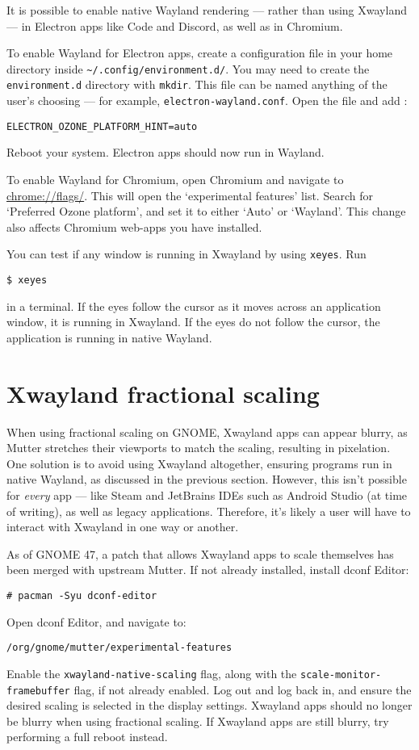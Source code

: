 \documentclass[a4paper]{article}
\begin{document}
It is possible to enable native Wayland rendering --- rather than using Xwayland --- in Electron apps like Code and Discord, as well as in Chromium.

To enable Wayland for Electron apps, create a configuration file in your home directory inside \lstinline|~/.config/environment.d/|.
You may need to create the \lstinline|environment.d| directory with \lstinline|mkdir|.
This file can be named anything of the user's choosing --- for example, \lstinline|electron-wayland.conf|.
Open the file and add \cite{arch-wiki-wayland}:
\begin{lstlisting}
ELECTRON_OZONE_PLATFORM_HINT=auto
\end{lstlisting}
Reboot your system.
Electron apps should now run in Wayland.

To enable Wayland for Chromium, open Chromium and navigate to \url{chrome://flags/}.
This will open the `experimental features' list.
Search for `Preferred Ozone platform', and set it to either `Auto' or `Wayland'.
This change also affects Chromium web-apps you have installed.

You can test if any window is running in Xwayland by using \lstinline|xeyes|.
Run
\begin{lstlisting}
$ xeyes
\end{lstlisting}
in a terminal.
If the eyes follow the cursor as it moves across an application window, it is running in Xwayland.
If the eyes do not follow the cursor, the application is running in native Wayland.


\section{Xwayland fractional scaling}

When using fractional scaling on GNOME, Xwayland apps can appear blurry, as Mutter stretches their viewports to match the scaling, resulting in pixelation.
One solution is to avoid using Xwayland altogether, ensuring programs run in native Wayland, as discussed in the previous section.
However, this isn't possible for \emph{every} app --- like Steam and JetBrains IDEs such as Android Studio (at time of writing), as well as legacy applications.
Therefore, it's likely a user will have to interact with Xwayland in one way or another.

As of GNOME 47, a patch that allows Xwayland apps to scale themselves has been merged with upstream Mutter.
If not already installed, install dconf Editor:
\begin{lstlisting}
# pacman -Syu dconf-editor
\end{lstlisting}
Open dconf Editor, and navigate to:
\begin{lstlisting}
/org/gnome/mutter/experimental-features
\end{lstlisting}
Enable the \lstinline|xwayland-native-scaling| flag, along with the \lstinline|scale-monitor-framebuffer| flag, if not already enabled.
Log out and log back in, and ensure the desired scaling is selected in the display settings.
Xwayland apps should no longer be blurry when using fractional scaling.
If Xwayland apps are still blurry, try performing a full reboot instead.
\end{document}
